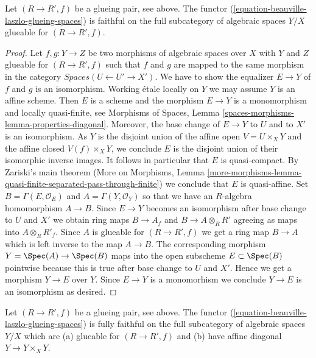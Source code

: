 \begin{lemma}
\label{lemma-glueing-f}
Let $(R \to R', f)$ be a glueing pair, see above.
The functor (\ref{equation-beauville-laszlo-glueing-spaces})
is faithful on the full subcategory of
algebraic spaces $Y/X$ glueable for $(R \to R', f)$.
\end{lemma}

\begin{proof}
Let $f, g : Y \to Z$ be two morphisms of algebraic spaces over $X$
with $Y$ and $Z$ glueable for $(R \to R', f)$ such that $f$ and $g$ are mapped
to the same morphism in the category $\textit{Spaces}(U \leftarrow U' \to X')$.
We have to show the equalizer $E \to Y$ of $f$ and $g$ is an isomorphism.
Working \'etale locally on $Y$ we may assume $Y$ is an affine scheme.
Then $E$ is a scheme and the morphism $E \to Y$ is a monomorphism
and locally quasi-finite, see Morphisms of Spaces, Lemma
\ref{spaces-morphisms-lemma-properties-diagonal}.
Moreover, the base change of $E \to Y$ to $U$ and to $X'$ is
an isomorphism. As $Y$ is the disjoint union of the affine open
$V = U \times_X Y$ and the affine closed $V(f) \times_X Y$, we conclude
$E$ is the disjoint union of their isomorphic inverse images.
It follows in particular that $E$ is quasi-compact.
By Zariski's main theorem (More on Morphisms, Lemma
\ref{more-morphisms-lemma-quasi-finite-separated-pass-through-finite})
we conclude that $E$ is quasi-affine.
Set $B = \Gamma(E, \mathcal{O}_E)$ and $A = \Gamma(Y, \mathcal{O}_Y)$
so that we have an $R$-algebra homomorphism $A \to B$.
Since $E \to Y$ becomes an isomorphism after base change to $U$ and $X'$
we obtain ring maps $B \to A_f$ and $B \to A \otimes_R R'$
agreeing as maps into $A \otimes_R R'_f$. Since $A$ is glueable
for $(R \to R', f)$ we get a ring map $B \to A$ which is left inverse
to the map $A \to B$. The corresponding morphism $Y = \Spec(A) \to \Spec(B)$
maps into the open subscheme $E \subset \Spec(B)$ pointwise because
this is true after base change to $U$ and $X'$. Hence we get a morphism
$Y \to E$ over $Y$. Since $E \to Y$ is a monomorhism we conclude
$Y \to E$ is an isomorphism as desired.
\end{proof}

\begin{lemma}
\label{lemma-glueing-ff}
Let $(R \to R', f)$ be a glueing pair, see above.
The functor (\ref{equation-beauville-laszlo-glueing-spaces})
is fully faithful on the full subcategory of
algebraic spaces $Y/X$ which are (a) glueable for $(R \to R', f)$
and (b) have affine diagonal $Y \to Y \times_X Y$.
\end{lemma}


